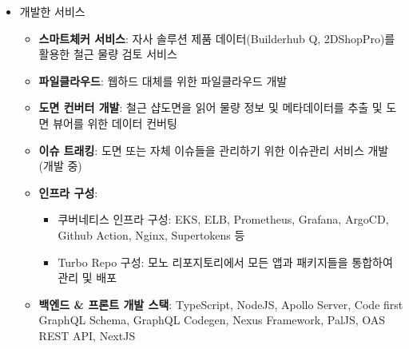 \begin{itemize}[label=]
	\item 개발한 서비스
	      \begin{itemize}[label=]
		      \item \textbf{스마트체커 서비스}: 자사 솔루션 제품 데이터(Builderhub Q, 2DShopPro)를 활용한 철근 물량 검토 서비스
		      \item \textbf{파일클라우드}: 웹하드 대체를 위한 파일클라우드 개발
		      \item \textbf{도면 컨버터 개발}: 철근 샵도면을 읽어 물량 정보 및 메타데이터를 추출 및 도면 뷰어를 위한 데이터 컨버팅
		      \item \textbf{이슈 트래킹}: 도면 또는 자체 이슈들을 관리하기 위한 이슈관리 서비스 개발 (개발 중)
		      \item \textbf{인프라 구성}:
		            \begin{itemize}
			            \item 쿠버네티스 인프라 구성: EKS, ELB, Prometheus, Grafana, ArgoCD, Github Action, Nginx, Supertokens 등
			            \item Turbo Repo 구성: 모노 리포지토리에서 모든 앱과 패키지들을 통합하여 관리 및 배포
		            \end{itemize}
		      \item \textbf{백엔드 \& 프론트 개발 스택}: TypeScript, NodeJS, Apollo Server, Code first GraphQL Schema, GraphQL Codegen, Nexus Framework, PalJS, OAS REST API, NextJS
	      \end{itemize}


\end{itemize}
